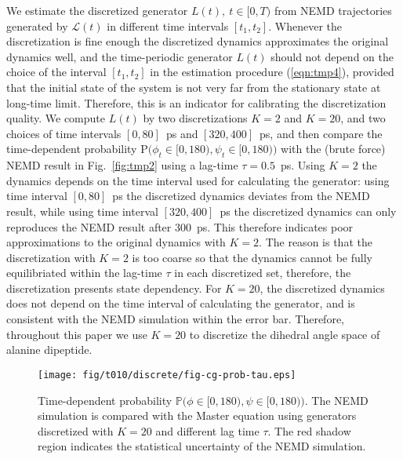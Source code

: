 \documentclass[aps, pre, preprint,unsortedaddress,a4paper,onecolumn]{revtex4}
\newcommand{\ml}[0]{\mathcal {L}}
\newcommand{\prob}{\textrm{P}}
\begin{document}
We estimate the discretized generator $L(t), \ t\in[0,T)$
from NEMD trajectories generated by $\ml(t)$ in different time intervals $[t_1,
t_2]$.
Whenever the discretization is fine enough the discretized dynamics approximates the original
dynamics well, and the time-periodic generator $L(t)$ should not depend on the choice of the interval $[t_1,t_2]$ in the estimation procedure (\ref{eqn:tmp4}), provided that the initial state of the system
is not very far from the stationary state at long-time limit.
Therefore, this is an indicator for calibrating the discretization quality.
We compute $L(t)$ by two discretizations $K=2$ and $K=20$, and two
choices of time intervals $[0, 80]$~ps and $[320, 400]$~ps, and then
compare the time-dependent probability $\prob\big(\phi_t\in[0,180), \psi_t\in [0,180)\big)$
with the (brute force) NEMD result in Fig.~\ref{fig:tmp2} using a lag-time $\tau=0.5$~ps.
Using $K=2$ the dynamics depends on the time interval used for
calculating the generator: using time interval $[0, 80]$~ps the discretized
dynamics deviates from the NEMD result,
while using time interval $[320, 400]$~ps the discretized dynamics can only
reproduces the NEMD result after 300~ps.  This therefore indicates poor 
approximations to the original dynamics with $K=2$. The reason is that the
discretization with $K=2$ is too coarse so that the dynamics cannot be fully
equilibriated within the lag-time $\tau$ in each discretized set,
therefore, the discretization presents state dependency.  For
$K=20$, the discretized dynamics does not depend on the time interval of
calculating the generator, and is consistent with the
NEMD simulation within the error bar. Therefore, throughout this paper we use $K=20$
to discretize  the dihedral angle space of alanine dipeptide.


\begin{figure}
  \centering
  \texttt{[image: fig/t010/discrete/fig-cg-prob-tau.eps]}  
  \caption{Time-dependent probability $\mathbb
    P\big(\phi\in[0,180), \psi\in [0,180)\big)$.  The NEMD simulation is compared with the Master equation using generators discretized with $K=20$ and different lag time $\tau$. The red shadow region indicates the
    statistical uncertainty of the NEMD simulation.}
  \label{fig:tmp3}
\end{figure}
\end{document}
